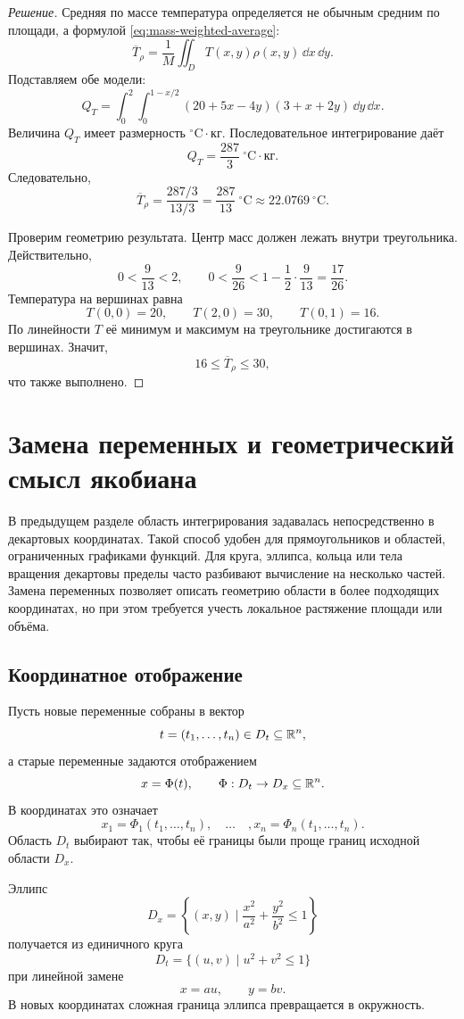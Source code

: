 \begin{proof}[Решение]
Средняя по массе температура определяется не обычным средним по площади, а формулой \eqref{eq:mass-weighted-average}:
\[
\overline T_{\rho}
=
\frac{1}{M}
\iint_D T(x,y)\rho(x,y)\,\dd x\,\dd y.
\]
Подставляем обе модели:
\[
Q_T
=
\int_0^2\int_0^{1-x/2}
(20+5x-4y)(3+x+2y)
\,\dd y\,\dd x.
\]
Величина $Q_T$ имеет размерность $^{\circ}\text{C}\cdot\text{кг}$. Последовательное интегрирование даёт
\[
Q_T=\frac{287}{3}\ ^{\circ}\text{C}\cdot\text{кг}.
\]
Следовательно,
\[
\overline T_{\rho}
=
\frac{287/3}{13/3}
=
\frac{287}{13}\ ^{\circ}\text{C}
\approx22.0769\ ^{\circ}\text{C}.
\]

Проверим геометрию результата. Центр масс должен лежать внутри треугольника. Действительно,
\[
0<\frac{9}{13}<2,
\qquad
0<\frac{9}{26}<1-\frac{1}{2}\cdot\frac{9}{13}
=
\frac{17}{26}.
\]
Температура на вершинах равна
\[
T(0,0)=20,
\qquad
T(2,0)=30,
\qquad
T(0,1)=16.
\]
По линейности $T$ её минимум и максимум на треугольнике достигаются в вершинах. Значит,
\[
16\leq\overline T_{\rho}\leq30,
\]
что также выполнено.
\end{proof}


\section{Замена переменных и геометрический смысл якобиана}
\label{sec:change-of-variables}

В предыдущем разделе область интегрирования задавалась непосредственно в декартовых координатах. Такой способ удобен для прямоугольников и областей, ограниченных графиками функций. Для круга, эллипса, кольца или тела вращения декартовы пределы часто разбивают вычисление на несколько частей. Замена переменных позволяет описать геометрию области в более подходящих координатах, но при этом требуется учесть локальное растяжение площади или объёма.

\subsection{Координатное отображение}

Пусть новые переменные собраны в вектор
\[
 t=(t_1,\dots,t_n)\in D_t\subseteq\mathbb{R}^n,
\]
а старые переменные задаются отображением
\[
 x=\Phi(t),
\qquad
\Phi:D_t\to D_x\subseteq\mathbb{R}^n.
\]
В координатах это означает
\[
 x_1=\Phi_1(t_1,\dots,t_n),
\quad\dots\quad,
 x_n=\Phi_n(t_1,\dots,t_n).
\]
Область $D_t$ выбирают так, чтобы её границы были проще границ исходной области $D_x$.

\begin{example}
Эллипс
\[
D_x=
\left\{
(x,y)
\mid
\frac{x^2}{a^2}+\frac{y^2}{b^2}\leq1
\right\}
\]
получается из единичного круга
\[
D_t=
\{(u,v)\mid u^2+v^2\leq1\}
\]
при линейной замене
\[
x=au,
\qquad
y=bv.
\]
В новых координатах сложная граница эллипса превращается в окружность.
\end{example}

